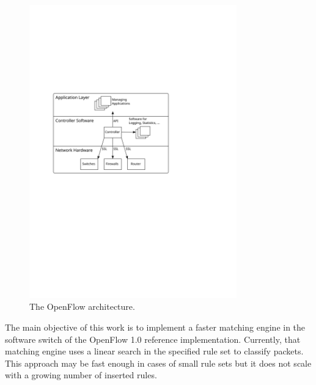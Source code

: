 \documentclass[a4paper,
		12pt,
		parskip=full,
		titlepage
		]{scrartcl}
\begin{document}
\begin{figure}
\centering
\includegraphics[width=0.8\textwidth]{images/openflow-arch}
\caption{The OpenFlow architecture.}
\label{fig:openflow-arch}
\end{figure}

The main objective of this work is to implement a faster matching engine in the software switch of the OpenFlow 1.0 reference implementation.
Currently, that matching engine uses a linear search in the specified rule set to classify packets.
This approach may be fast enough in cases of small rule sets but it does not scale
with a growing number of inserted rules.
\end{document}
